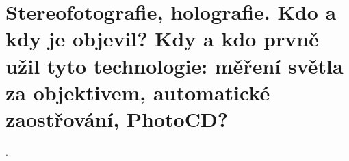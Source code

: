 \section{Stereofotografie, holografie. Kdo a kdy je objevil? Kdy a kdo prvně užil tyto technologie: měření světla za 
objektivem, automatické zaostřování, PhotoCD?}.
